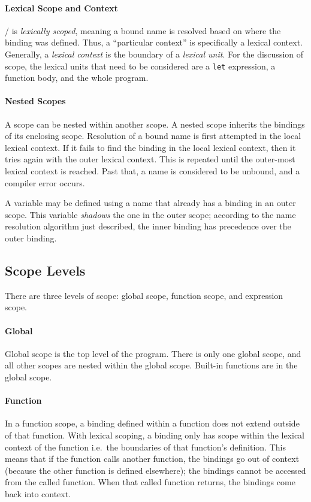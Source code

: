 \documentclass[a4paper, 12pt]{article}
\begin{document}
\paragraph{Lexical Scope and Context}
\lispy/ is \textit{lexically scoped}, meaning a bound name is resolved based on where the binding was defined. Thus, a ``particular context'' is specifically a lexical context. Generally, a \textit{lexical context} is the boundary of a \textit{lexical unit}. For the discussion of scope, the lexical units that need to be considered are a \texttt{let} expression, a function body, and the whole program.

\paragraph{Nested Scopes}
A scope can be nested within another scope. A nested scope inherits the bindings of its enclosing scope. Resolution of a bound name is first attempted in the local lexical context. If it fails to find the binding in the local lexical context, then it tries again with the outer lexical context. This is repeated until the outer-most lexical context is reached. Past that, a name is considered to be unbound, and a compiler error occurs.

A variable may be defined using a name that already has a binding in an outer scope. This variable \textit{shadows} the one in the outer scope; according to the name resolution algorithm just described, the inner binding has precedence over the outer binding.

\subsection{Scope Levels}
There are three levels of scope: global scope, function scope, and expression scope.

\paragraph{Global}
Global scope is the top level of the program. There is only one global scope, and all other scopes are nested within the global scope. Built-in functions are in the global scope.

\paragraph{Function}
In a function scope, a binding defined within a function does not extend outside of that function. With lexical scoping, a binding only has scope within the lexical context of the function i.e.\ the boundaries of that function's definition. This means that if the function calls another function, the bindings go out of context (because the other function is defined elsewhere); the bindings cannot be accessed from the called function. When that called function returns, the bindings come back into context.
\end{document}
